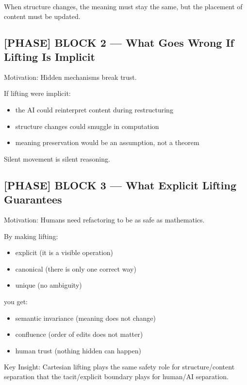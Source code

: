 When structure changes, the meaning must stay the same, but the placement of content must be updated.\par

\subsection*{[PHASE] BLOCK 2 --- What Goes Wrong If Lifting Is Implicit}

Motivation: Hidden mechanisms break trust.\par

If lifting were implicit:\n\n\begin{itemize}\n\item the AI could reinterpret content during restructuring
\item structure changes could smuggle in computation
\item meaning preservation would be an assumption, not a theorem\n\end{itemize}

 Silent movement is silent reasoning.\par

\subsection*{[PHASE] BLOCK 3 --- What Explicit Lifting Guarantees}

Motivation: Humans need refactoring to be as safe as mathematics.\par

By making lifting:\n\n\begin{itemize}\n\item explicit (it is a visible operation)
\item canonical (there is only one correct way)
\item unique (no ambiguity)\n\end{itemize}

you get:\n\n\begin{itemize}\n\item semantic invariance (meaning does not change)
\item confluence (order of edits does not matter)
\item human trust (nothing hidden can happen)\n\end{itemize}

 Key Insight: Cartesian lifting plays the same safety role for structure/content separation that the tacit/explicit boundary plays for human/AI separation.\par

